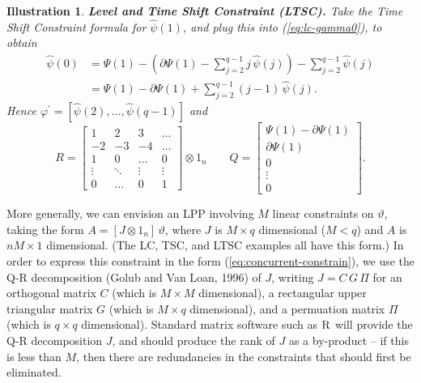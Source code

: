 \documentclass[a4paper]{book}
\newtheorem{Illustration}{Illustration}
\begin{document}
 
\begin{Illustration}  {\bf Level and Time Shift Constraint (LTSC).}  \rm
\label{ill:ltsc}
   Take the Time Shift Constraint formula for $\widehat{\psi} (1)$,
 and plug this into (\ref{eq:lc-gamma0}), to obtain
\begin{align*}
 \widehat{\psi} (0)  & = \Psi (1) - \left( \partial {\Psi} (1)  -  \sum_{j=2}^{q-1} j  \, \widehat{\psi} (j) \right) -  \sum_{j=2}^{q-1} 
 \widehat{\psi} (j)  \\
	& = \Psi (1) -  \partial {\Psi} (1)  +  \sum_{j=2}^{q-1} (j-1)  \, \widehat{\psi} (j).
\end{align*}
 Hence  $ \varphi^{\prime}  = [  \widehat{\psi} (2), \ldots, \widehat{\psi} (q-1)  ] $ and
\[
	R  = \left[ \begin{array}{cccc} 1 & 2  &  3  &   \ldots    \\  -2  & -3  &  -4  & \ldots  \\
		 1  & 0 & \ldots & 0 \\ 
		\vdots & \ddots & \vdots & \vdots \\ 0 & \ldots & 0 & 1 \end{array} \right]  \otimes 1_n \qquad
	Q = \left[ \begin{array}{c} \Psi (1) - \partial {\Psi} (1)  \\  \partial {\Psi} (1) \\ 0 \\ \vdots \\ 0 \end{array} \right].
\]
\end{Illustration}



 More generally, we can envision an LPP involving $M$ linear constraints on 
  $\vartheta$, taking the form
 $   A = [ J \otimes 1_n ] \, \vartheta$, where $J$ is $M \times q$ 
 dimensional ($M < q$) and $A$ is $n M \times 1$ dimensional.
 (The LC, TSC, and LTSC examples all have this form.)  In order to express 
 this constraint in the form 
 (\ref{eq:concurrent-constrain}), we use the Q-R decomposition 
 (Golub and Van Loan, 1996) of $J$, writing
 $J = C \, G \, \Pi$ for an orthogonal matrix $C$ (which is $M \times M$ dimensional),
 a rectangular upper triangular matrix $G$
 (which is $M \times q$ dimensional), and a permuation matrix $\Pi$ 
 (which is $q \times q$ dimensional).  
 Standard matrix software such as $\textsc{R}$ will provide the Q-R decomposition $J$,
 and should produce the rank of $J$ as  a by-product --
 if this is less than $M$, then there are redundancies in the 
 constraints that should first be eliminated. 
 
\end{document}
